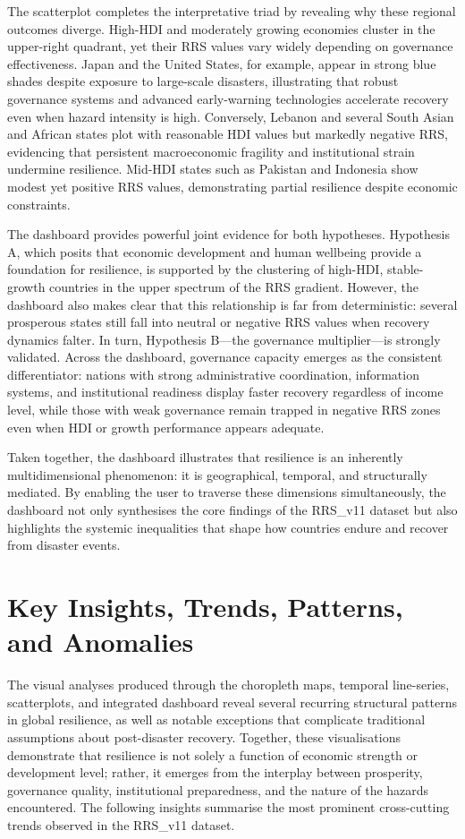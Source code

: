 \documentclass[conference]{IEEEtran}
\begin{document}
The scatterplot completes the interpretative triad by revealing why these regional outcomes diverge. High-HDI and moderately growing economies cluster in the upper-right quadrant, yet their RRS values vary widely depending on governance effectiveness. Japan and the United States, for example, appear in strong blue shades despite exposure to large-scale disasters, illustrating that robust governance systems and advanced early-warning technologies accelerate recovery even when hazard intensity is high. Conversely, Lebanon and several South Asian and African states plot with reasonable HDI values but markedly negative RRS, evidencing that persistent macroeconomic fragility and institutional strain undermine resilience. Mid-HDI states such as Pakistan and Indonesia show modest yet positive RRS values, demonstrating partial resilience despite economic constraints.

The dashboard provides powerful joint evidence for both hypotheses. Hypothesis A, which posits that economic development and human wellbeing provide a foundation for resilience, is supported by the clustering of high-HDI, stable-growth countries in the upper spectrum of the RRS gradient. However, the dashboard also makes clear that this relationship is far from deterministic: several prosperous states still fall into neutral or negative RRS values when recovery dynamics falter. In turn, Hypothesis B—the governance multiplier—is strongly validated. Across the dashboard, governance capacity emerges as the consistent differentiator: nations with strong administrative coordination, information systems, and institutional readiness display faster recovery regardless of income level, while those with weak governance remain trapped in negative RRS zones even when HDI or growth performance appears adequate.

Taken together, the dashboard illustrates that resilience is an inherently multidimensional phenomenon: it is geographical, temporal, and structurally mediated. By enabling the user to traverse these dimensions simultaneously, the dashboard not only synthesises the core findings of the RRS\_v11 dataset but also highlights the systemic inequalities that shape how countries endure and recover from disaster events.

\section{Key Insights, Trends, Patterns, and Anomalies}
\noindent
The visual analyses produced through the choropleth maps, temporal line-series, scatterplots, and integrated dashboard reveal several recurring structural patterns in global resilience, as well as notable exceptions that complicate traditional assumptions about post-disaster recovery. Together, these visualisations demonstrate that resilience is not solely a function of economic strength or development level; rather, it emerges from the interplay between prosperity, governance quality, institutional preparedness, and the nature of the hazards encountered. The following insights summarise the most prominent cross-cutting trends observed in the RRS\_v11 dataset.
\end{document}
